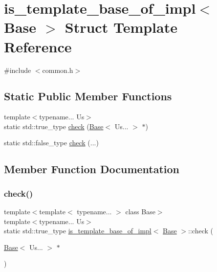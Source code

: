 \hypertarget{structis__template__base__of__impl}{}\section{is\+\_\+template\+\_\+base\+\_\+of\+\_\+impl$<$ Base $>$ Struct Template Reference}
\label{structis__template__base__of__impl}


{\ttfamily \#include $<$common.\+h$>$}

\subsection*{Static Public Member Functions}
\begin{DoxyCompactItemize}
\item 
{\footnotesize template$<$typename... Us$>$ }\\static std\+::true\+\_\+type \mbox{\hyperlink{structis__template__base__of__impl_abdd050106f967915ac33b745dfd0e955}{check}} (\mbox{\hyperlink{struct_base}{Base}}$<$ Us... $>$ $\ast$)
\item 
static std\+::false\+\_\+type \mbox{\hyperlink{structis__template__base__of__impl_a1223262875fc83b72c685b57747e9641}{check}} (...)
\end{DoxyCompactItemize}


\subsection{Member Function Documentation}
\mbox{\label{structis__template__base__of__impl_abdd050106f967915ac33b745dfd0e955}} 
\subsubsection{\texorpdfstring{check()}{check()}\hspace{0.1cm}{\footnotesize\ttfamily [1/2]}}
{\footnotesize\ttfamily template$<$template$<$ typename... $>$ class Base$>$ \\
template$<$typename... Us$>$ \\
static std\+::true\+\_\+type \mbox{\hyperlink{structis__template__base__of__impl}{is\+\_\+template\+\_\+base\+\_\+of\+\_\+impl}}$<$ \mbox{\hyperlink{struct_base}{Base}} $>$\+::check (\begin{DoxyParamCaption}\item[{\mbox{\hyperlink{struct_base}{Base}}$<$ Us... $>$ $\ast$}]{ }\end{DoxyParamCaption})\hspace{0.3cm}{\ttfamily [static]}}

